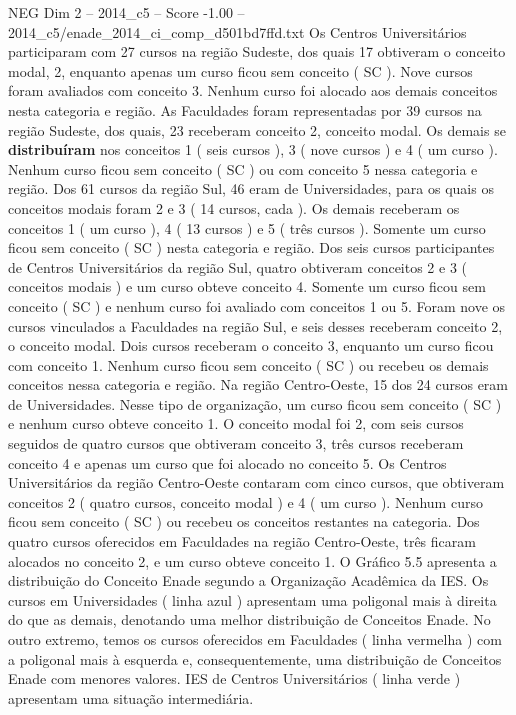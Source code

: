 \begin{textsample}{NEG Dim 2 – 2014\_c5 – Score -1.00 – 2014\_c5/enade\_2014\_ci\_comp\_d501bd7ffd.txt}
Os Centros Universitários participaram com 27 cursos na região Sudeste, dos quais 17 obtiveram o conceito modal, 2, enquanto apenas um curso ficou sem conceito ( SC ).
Nove cursos foram avaliados com conceito 3.
Nenhum curso foi alocado aos demais conceitos nesta categoria e região.
As Faculdades foram representadas por 39 cursos na região Sudeste, dos quais, 23 receberam conceito 2, conceito modal.
Os demais se \textbf{distribuíram} nos conceitos 1 ( seis cursos ), 3 ( nove cursos ) e 4 ( um curso ).
Nenhum curso ficou sem conceito ( SC ) ou com conceito 5 nessa categoria e região.
Dos 61 cursos da região Sul, 46 eram de Universidades, para os quais os conceitos modais foram 2 e 3 ( 14 cursos, cada ).
Os demais receberam os conceitos 1 ( um curso ), 4 ( 13 cursos ) e 5 ( três cursos ).
Somente um curso ficou sem conceito ( SC ) nesta categoria e região.
Dos seis cursos participantes de Centros Universitários da região Sul, quatro obtiveram conceitos 2 e 3 ( conceitos modais ) e um curso obteve conceito 4.
Somente um curso ficou sem conceito ( SC ) e nenhum curso foi avaliado com conceitos 1 ou 5.
Foram nove os cursos vinculados a Faculdades na região Sul, e seis desses receberam conceito 2, o conceito modal.
Dois cursos receberam o conceito 3, enquanto um curso ficou com conceito 1.
Nenhum curso ficou sem conceito ( SC ) ou recebeu os demais conceitos nessa categoria e região.
Na região Centro-Oeste, 15 dos 24 cursos eram de Universidades.
Nesse tipo de organização, um curso ficou sem conceito ( SC ) e nenhum curso obteve conceito 1.
O conceito modal foi 2, com seis cursos seguidos de quatro cursos que obtiveram conceito 3, três cursos receberam conceito 4 e apenas um curso que foi alocado no conceito 5.
Os Centros Universitários da região Centro-Oeste contaram com cinco cursos, que obtiveram conceitos 2 ( quatro cursos, conceito modal ) e 4 ( um curso ).
Nenhum curso ficou sem conceito ( SC ) ou recebeu os conceitos restantes na categoria.
Dos quatro cursos oferecidos em Faculdades na região Centro-Oeste, três ficaram alocados no conceito 2, e um curso obteve conceito 1.
O Gráfico 5.5 apresenta a distribuição do Conceito Enade segundo a Organização Acadêmica da IES.
Os cursos em Universidades ( linha azul ) apresentam uma poligonal mais à direita do que as demais, denotando uma melhor distribuição de Conceitos Enade.
No outro extremo, temos os cursos oferecidos em Faculdades ( linha vermelha ) com a poligonal mais à esquerda e, consequentemente, uma distribuição de Conceitos Enade com menores valores.
IES de Centros Universitários ( linha verde ) apresentam uma situação intermediária.

\end{textsample}
